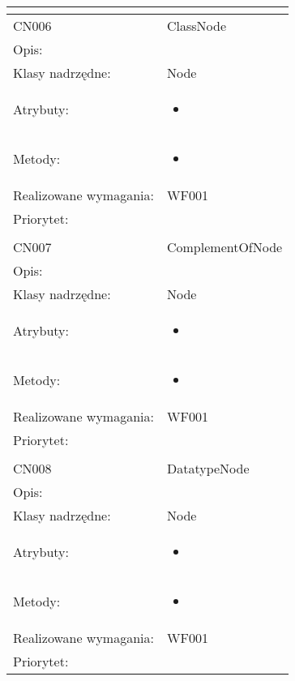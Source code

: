 \documentclass[a4paper,10pt]{article}
\begin{document}
\begin{center}
\begin{longtable}{|m{3cm}|m{9cm}|}
\multicolumn{2}{c}{} \\
 \hline

CN006 & ClassNode \\ \hline
Opis: &     \\ \hline
Klasy nadrzędne: & Node     \\ \hline
Atrybuty: & \begin{itemize}
 \item 
\end{itemize}
 \\ \hline
Metody: & \begin{itemize}
 \item 
\end{itemize}
  \\ \hline
Realizowane wymagania: & WF001 \\ \hline
Priorytet: &  \\ \hline

\multicolumn{2}{c}{} \\
 \hline

CN007 & ComplementOfNode \\ \hline
Opis: &     \\ \hline
Klasy nadrzędne: & Node     \\ \hline
Atrybuty: & \begin{itemize}
 \item 
\end{itemize}
 \\ \hline
Metody: & \begin{itemize}
 \item 
\end{itemize}
  \\ \hline
Realizowane wymagania: & WF001 \\ \hline
Priorytet: &  \\ \hline

\multicolumn{2}{c}{} \\
 \hline

CN008 & DatatypeNode \\ \hline
Opis: &     \\ \hline
Klasy nadrzędne: & Node     \\ \hline
Atrybuty: & \begin{itemize}
 \item 
\end{itemize}
 \\ \hline
Metody: & \begin{itemize}
 \item 
\end{itemize}
  \\ \hline
Realizowane wymagania: & WF001 \\ \hline
Priorytet: &  \\ \hline


\end{longtable}
\end{center}
\end{document}
